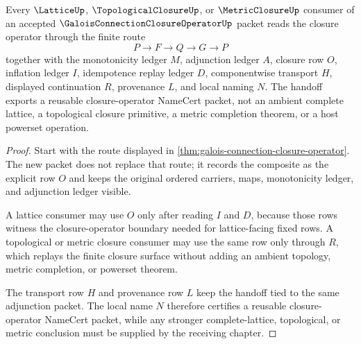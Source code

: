 \begin{theorem}
\label{thm:galois-connection-closure-operator-lattice-handoff}
Every $\LatticeUp$, $\TopologicalClosureUp$, or $\MetricClosureUp$ consumer of an accepted $\GaloisConnectionClosureOperatorUp$ packet reads the closure operator through the finite route
$$
P \longrightarrow F \longrightarrow Q \longrightarrow G \longrightarrow P
$$
together with the monotonicity ledger $M$, adjunction ledger $A$, closure row $O$, inflation ledger $I$, idempotence replay ledger $D$, componentwise transport $H$, displayed continuation $R$, provenance $L$, and local naming $N$. The handoff exports a reusable closure-operator NameCert packet, not an ambient complete lattice, a topological closure primitive, a metric completion theorem, or a host powerset operation.
\end{theorem}
\begin{proof}
Start with the route displayed in \autoref{thm:galois-connection-closure-operator}. The new packet does not replace that route; it records the composite as the explicit row $O$ and keeps the original ordered carriers, maps, monotonicity ledger, and adjunction ledger visible.

A lattice consumer may use $O$ only after reading $I$ and $D$, because those rows witness the closure-operator boundary needed for lattice-facing fixed rows. A topological or metric closure consumer may use the same row only through $R$, which replays the finite closure surface without adding an ambient topology, metric completion, or powerset theorem.

The transport row $H$ and provenance row $L$ keep the handoff tied to the same adjunction packet. The local name $N$ therefore certifies a reusable closure-operator NameCert packet, while any stronger complete-lattice, topological, or metric conclusion must be supplied by the receiving chapter.
\end{proof}



